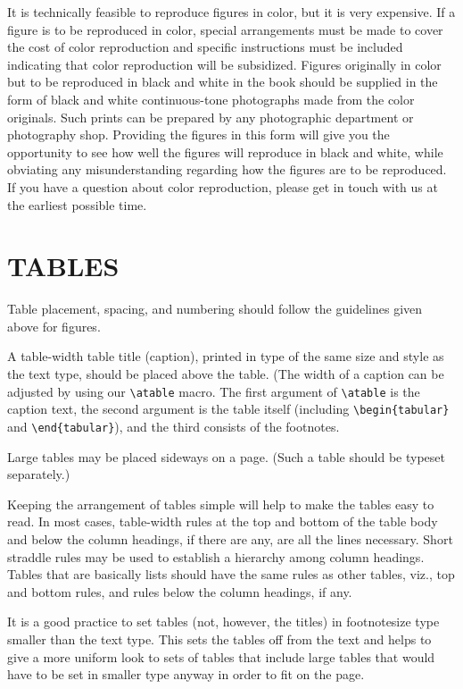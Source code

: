 \documentclass[12pt]{book}
\begin{document}
It is technically feasible to reproduce figures in color, but it is
very expensive. If a figure is to be reproduced in color, special
arrangements must be made to cover the cost of color reproduction
and specific instructions must be included indicating that color
reproduction will be subsidized. Figures originally in color but to
be reproduced in black and white in the book should be supplied in
the form of black and white continuous-tone photographs made from
the color originals. Such prints can be prepared by any
photographic department or photography shop. Providing the figures
in this form will give you the opportunity to see how well the
figures will reproduce in black and white, while obviating any
misunderstanding regarding how the figures are to be reproduced. If
you have a question about color reproduction, please get in touch
with us at the earliest possible time.

\section{TABLES}

Table placement, spacing, and numbering should follow the
guidelines given above for figures.

A table-width table title (caption), printed in type of the same
size and style as the text type, should be placed above the table.
(The width of a caption can be adjusted by using our \verb+\atable+
macro. The first argument of \verb+\atable+ is the caption text,
the second argument is the table itself (including
\verb+\begin{tabular}+ and \verb+\end{tabular}+), and the third
consists of the footnotes.

Large tables may be placed sideways on a page. (Such a table should
be typeset separately.)

Keeping the arrangement of tables simple will help to make the
tables easy to read. In most cases, table-width rules at the top
and bottom of the table body and below the column headings, if
there are any, are all the lines necessary. Short straddle rules
may be used to establish a hierarchy among column headings. Tables
that are basically lists should have the same rules as other
tables, viz., top and bottom rules, and rules below the column
headings, if any.

It is a good practice to set tables (not, however, the titles) in
footnotesize type smaller than the text type. This sets the tables
off from the text and helps to give a more uniform look to sets of
tables that include large tables that would have to be set in
smaller type anyway in order to fit on the page.
\end{document}
